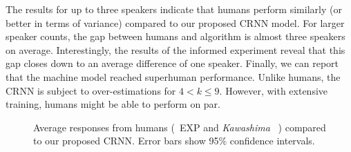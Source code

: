  The results for up to three speakers indicate that humans perform similarly (or better in terms of variance) compared to our proposed CRNN model.
 For larger speaker counts, the gap between humans and algorithm is almost three speakers on average.
 Interestingly, the results of the informed experiment reveal that this gap closes down to an average difference of one speaker.
 Finally, we can report that the machine model reached superhuman performance.
 Unlike humans, the CRNN is subject to over-estimations for \(4 < k \leq 9\).
 However, with extensive training, humans might be able to perform on par.
 
\begin{figure}[t!]
   \centering
   \begin{adjustbox}{width=0.7\columnwidth}
     
   \end{adjustbox}
   \caption{Average responses from humans (\
   {EXP} and \emph{Kawashima}
~\cite{kawashima15}) compared to our proposed CRNN. Error bars show 95\% confidence intervals.}%
   \label{fig:experiment}
\end{figure}

